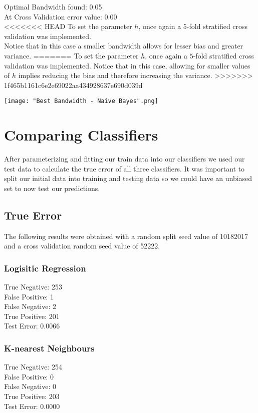 \documentclass[a4paper]{article}
\newcommand\tab[1][1cm]{\hspace*{#1}}
\begin{document}
Optimal Bandwidth found: 0.05\\
At Cross Validation error value: 0.00\\

<<<<<<< HEAD
To set the parameter $h$, once again a $5$-fold stratified cross validation was implemented.\\ 
Notice that in this case a smaller bandwidth allows for lesser bias and greater variance.
=======
To set the parameter $h$, once again a $5$-fold stratified cross validation was implemented.
Notice that in this case, allowing for smaller values of $h$ implies reducing the bias and therefore increasing the variance.
>>>>>>> 1f465b1161c6e2e69022aa434928637e690d039d

\texttt{[image: "Best Bandwidth - Naive Bayes".png]}


\section{Comparing Classifiers}

After parameterizing and fitting our train data into our classifiers we used our test data to calculate the true error of all
three classifiers.
It was important to split our initial data into training and testing data so we could have an unbiased set to now test our predictions.

\subsection{True Error}

The following results were obtained with a random split seed value of 10182017 and a cross validation random seed value of 52222.

\subsubsection{Logisitic Regression}
	\tab True Negative: 253\\
        	\tab False Positive: 1\\
        	\tab False Negative: 2\\
        	\tab True Positive: 201\\
        	\tab Test Error: 0.0066

\subsubsection{K-nearest Neighbours}
	\tab True Negative: 254\\
        	\tab False Positive: 0\\
        	\tab False Negative: 0\\
        	\tab True Positive: 203\\
        	\tab Test Error: 0.0000
\end{document}
